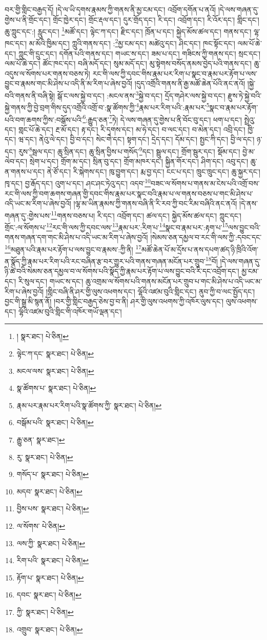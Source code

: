 བར་གྱི་གླིང་བརྒྱད་དོ། །དེ་ལ་ཡི་དྭགས་རྣམས་ཀྱི་གནས་ནི་མྱ་ངམ་དང་། འབྲོག་དགོན་པ་ནའོ། །དེ་ལས་གཞན་དུ་གྱེས་པ་ནི་གྲོང་དང་། གྲོང་ཁྱེར་དང་། གྲོང་རྡལ་དང་། དུར་གྲོད་དང་། རི་དང་། འབྲོག་དང་། རི་འོར་དང་། གླིང་དང་། ཆུ་ཀླུང་དང་:། རླུང་དང་། \footnote{།    སྣར་ཐང་།  པེ་ཅིན། }མཚོ་དང་། ལྟེང་ཀ་དང་། རྫིང་དང་། ཁྲོན་པ་དང་། སྐྱེད་མོས་ཚལ་དང་། གནས་དང་། ལྷ་ཁང་དང་། མ་མོའི་ཁྱིམ་དང་། ཀླུའི་གནས་དང་། :\footnote{ལྟེང་ཀ་དང་  སྣར་ཐང་།  པེ་ཅིན། }མྱ་ངམ་དང་། མཚེའུ་དང་། ཤིང་དང་། ཁང་སྟོང་དང་། ལམ་པོ་ཆེ་དང་། ཀླུང་གི་དྲུང་དང་། དགོན་པའི་གནས་དང་། གཡང་ས་དང་། ཟམ་པ་དང་། གཟིངས་ཀྱི་གནས་དང་། སྲང་དང་། ལམ་པོ་ཆེ་དང་། ཚོང་ཁང་དང་། བཞི་མདོ་དང་། སུམ་མདོ་དང་། མུ་སྟེགས་བསོད་ནམས་བྱེད་པའི་གནས་དང་། ཆུ་འདུས་ལ་སོགས་པར་གནས་བཅས་ཏེ། རང་གི་ལས་ཀྱི་དབང་གིས་རྣམ་པར་རིག་པ་སྣང་བ་རྣམ་པར་རྟོག་པ་ལས་བྱུང་བ་རྣམས་གང་མི་ཤེས་པ་འདི་ནི་མ་རིག་པ་ཞེས་བྱའོ། །དུད་འགྲོའི་གནས་ནི་རྒྱ་མཚོ་ཆེན་པོའི་ནང་ནའོ། །སྐྱེ་བའི་གནས་ནི་བཞི་སྟེ། སྒོ་ང་ལས་སྐྱེ་བ་དང་། :མངལ་ནས་\footnote{མངལ་ལས་  སྣར་ཐང་།  པེ་ཅིན། }སྐྱེ་བ་དང་། དྲོད་གཤེར་ལས་སྐྱེ་བ་དང་། རྫུས་ཏེ་སྐྱེ་བའི་སྐྱེ་གནས་ཀྱི་བྱེ་བྲག་གིས་དུད་འགྲོའི་འགྲོ་བ་:སྣ་ཚོགས་ཀྱི་\footnote{སྣ་ཚོགས་པ་  སྣར་ཐང་།  པེ་ཅིན། }རྣམ་པར་རིག་པའི་:རྣམ་པར་\footnote{རྣམ་པར་རྣམ་པར་རིག་པའི་སྣ་ཚོགས་ཀྱི་  སྣར་ཐང་།  པེ་ཅིན། }སྣང་བ་རྣམ་པར་རྟོག་པའི་བག་ཆགས་ཀྱིས་:བསྒོས་པའི་\footnote{བསྒོམ་པའི་  སྣར་ཐང་།  པེ་ཅིན། }:རྒྱུད་ཅན་\footnote{རྒྱུ་ཅན་  སྣར་ཐང་། }ཏེ། དེ་ལས་གཞན་དུ་གྱེས་པ་ནི་བོང་བུ་དང་། ཕག་པ་དང་། སྤྲེའུ་དང་། གླང་པོ་ཆེ་དང་། རྔ་མོ་དང་། རྟ་དང་། རི་དྭགས་དང་། མ་ཧེ་དང་། བ་ལང་དང་། བ་མེན་དང་། འབྲི་དང་། ཁྱི་དང་། ཝ་དང་། ནེའུ་ལེ་དང་། བྱི་བ་དང་། སེང་གེ་དང་། སྟག་དང་། དྲེད་དང་། དོམ་དང་། སྤྱང་ཀི་དང་། བྱི་ལ་དང་། ཉ་དང་། རུས་\footnote{རུ་  སྣར་ཐང་།  པེ་ཅིན། }སྦལ་དང་། ཆུ་སྲིན་དང་། ཆུ་སྲིན་བྱིས་པ་གསོད་\footnote{གསོད་པ་  སྣར་ཐང་།  པེ་ཅིན། }དང་། སྦྲུལ་དང་། གྲོག་སྦུར་དང་། སྡོམ་དང་། བྱེ་མ་ལེབ་དང་། སྲེག་པ་དང་། གྲོག་མ་དང་། སྲིན་བུ་དང་། གྲོག་མཁར་དང་། སྐྱིན་གོར་དང་། ཤིག་དང་། འབུ་དང་། ཆུ་ན་གནས་པ་དང་། ནེ་ཙོ་དང་། རི་སྐེགས་དང་། ཁུ་བྱུག་དང་། རྨ་བྱ་དང་། ངང་པ་དང་། ཁྲུང་ཁྲུང་དང་། ཆུ་སྐྱར་དང་། ཁྭ་དང་། བྱ་རྒོད་དང་། འུག་པ་དང་། ཤང་ཤང་ཏེའུ་དང་། འདབ་\footnote{མདབ་  སྣར་ཐང་།  པེ་ཅིན། }བཟང་ལ་སོགས་པ་གནས་མ་ངེས་པའི་འགྲོ་བས་རང་གི་ལས་ཀྱི་བག་ཆགས་གཞན་གྱི་དབང་གིས་རྣམ་པར་སྣང་བའི་རྣམ་པ་ལ་གནས་བཅས་པ་གང་མི་ཤེས་པ་འདི་ཡང་མ་རིག་པ་ཞེས་བྱའོ། །ལྷ་མ་ཡིན་རྣམས་ཀྱི་གནས་བཞི་ནི་རི་རབ་ཀྱི་བང་རིམ་བཞིའི་ནང་ནའོ། །དེ་ནས་གཞན་དུ་:གྱེས་པས་\footnote{བྱིས་པས་  སྣར་ཐང་།  པེ་ཅིན། }གནས་བཅས་པ། རི་དང་། འབྲོག་དང་། ཚལ་དང་། སྐྱེད་མོས་ཚལ་དང་། ཀླུང་དང་། གྲོང་:ལ་སོགས་པ་\footnote{ལ་སོགས་  པེ་ཅིན། }རང་གི་ལས་ཀྱི་དབང་ལས་\footnote{ལས་ཀྱི་  སྣར་ཐང་།  པེ་ཅིན། }རྣམ་པར་:རིག་པ་\footnote{རིག་པའི་  སྣར་ཐང་།  པེ་ཅིན། }སྣང་བ་རྣམ་པར་:རྟག་པ་\footnote{རྟོག་པ་  སྣར་ཐང་།  པེ་ཅིན། }ལས་བྱུང་བའི་གནས་གཞན་དག་གང་མི་ཤེས་པ་འདི་ཡང་མ་རིག་པ་ཞེས་བྱའོ། །སེམས་ཅན་དམྱལ་བ་རང་གི་ལས་ཀྱི་:དབང་དང་\footnote{དབང་  སྣར་ཐང་།  པེ་ཅིན། }མཐུན་པའི་རྣམ་པར་རྟོག་པ་ལས་བྱུང་བ་རྣམས་:ཀྱི་ནི། \footnote{ཀྱི་  སྣར་ཐང་།  པེ་ཅིན། }མཚོ་ཆེན་པོ་མ་དྲོས་པ་ནས་དཔག་ཚད་ཉི་ཁྲིའི་འོག་ན་སྣོད་ཀྱི་རྣམ་པར་རིག་པའི་རང་བཞིན་རྩ་བར་གྱུར་པའི་གནས་གཞན་མངོན་པར་གྲུབ་\footnote{འགྲུབ་  སྣར་ཐང་།  པེ་ཅིན། }བོ། །དེ་ལས་གཞན་དུ་ཉི་ཚེ་བའི་སེམས་ཅན་དམྱལ་བ་ལ་སོགས་པའི་སྣོད་ཀྱི་རྣམ་པར་རྟོག་པ་ལས་བྱུང་བའི་རི་དང་འབྲོག་དང་། མྱ་ངམ་དང་། རི་སུལ་དང་། གཡང་ས་དང་། ཆུ་འགྲམ་ལ་སོགས་པའི་གནས་མངོན་པར་གྲུབ་པ་གང་མི་ཤེས་པ་འདི་ཡང་མ་རིག་པ་ཞེས་བྱའོ། །གླིང་བཞི་ནི་ཤར་གྱི་ལུས་འཕགས་དང་། ལྷོའི་འཛམ་བུའི་གླིང་དང་། ནུབ་ཀྱི་བ་ལང་སྤྱོད་དང་། བྱང་གི་སྒྲ་མི་སྙན་ནོ། །བར་གྱི་གླིང་བརྒྱད་ཅེས་བྱ་བ་ནི། ཤར་གྱི་ལུས་འཕགས་ཀྱི་འཁོར་ལུས་དང་། ལུས་འཕགས་དང་། ལྷོའི་འཛམ་བུའི་གླིང་གི་འཁོར་གཡོ་ལྡན་དང་། 